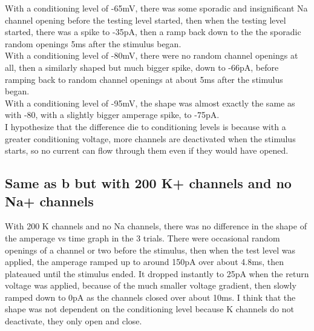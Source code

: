 \documentclass[11pt]{article}
\begin{document}
With a conditioning level of -65mV, there was some sporadic and insignificant Na channel opening
before the testing level started, then when the testing level started, there was a spike to -35pA,
then a ramp back down to the the sporadic random openings 5ms after the stimulus began.\\
With a conditioning level of -80mV, there were no random channel openings at all, then a similarly shaped
but much bigger spike, down to -66pA, before ramping back to random channel openings at about 5ms after
the stimulus began.\\
With a conditioning level of -95mV, the shape was almost exactly the same as with -80, with a slightly
bigger amperage spike, to -75pA.\\
I hypothesize that the difference die to conditioning levels is because with a greater conditioning voltage,
more channels are deactivated when the stimulus starts, so no current can flow through them even if 
they would have opened.
\subsection{Same as b but with 200 K+ channels and no Na+ channels}
With 200 K channels and no Na channels, there was no difference in the shape of the amperage vs time graph
in the 3 trials.  There were occasional random openings of a channel or two before the stimulus,
then when the test level was applied, the amperage ramped up to around 150pA over about 4.8ms,
then plateaued until the stimulus ended.  It dropped instantly to 25pA when the return voltage was applied,
because of the much smaller voltage gradient, then slowly ramped down to 0pA as the channels closed over about 10ms.
I think that the shape was not dependent on the conditioning level because K channels do not deactivate,
they only open and close.
\end{document}
